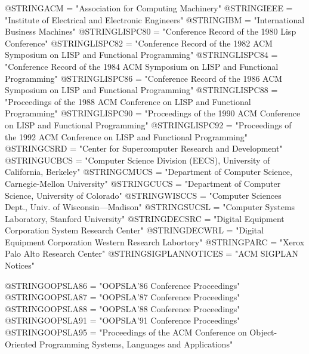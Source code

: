 @STRING{ACM = "Association for Computing Machinery"}
@STRING{IEEE = "Institute of Electrical and Electronic Engineers"}
@STRING{IBM = "International Business Machines"}
@STRING{LISPC80 = "Conference Record of the 1980 Lisp Conference"}
@STRING{LISPC82 = "Conference Record of the 1982 ACM Symposium on LISP and Functional Programming"}
@STRING{LISPC84 = "Conference Record of the 1984 ACM Symposium on LISP and Functional Programming"}
@STRING{LISPC86 = "Conference Record of the 1986 ACM Symposium on LISP and Functional Programming"}
@STRING{LISPC88 = "Proceedings of the 1988 ACM Conference on LISP and Functional Programming"}
@STRING{LISPC90 = "Proceedings of the 1990 ACM Conference on LISP and Functional Programming"}
@STRING{LISPC92 = "Proceedings of the 1992 ACM Conference on LISP and Functional Programming"}
@STRING{CSRD = "Center for Supercomputer Research and Development"}
@STRING{UCBCS = "Computer Science Division (EECS), University of California, Berkeley"}
@STRING{CMUCS = "Department of Computer Science, Carnegie-Mellon University"}
@STRING{CUCS = "Department of Computer Science, University of Colorado"}
@STRING{WISCCS = "Computer Sciences Dept., Univ. of Wisconsin---Madison"}
@STRING{SUCSL = "Computer Systems Laboratory, Stanford University"}
@STRING{DECSRC = "Digital Equipment Corporation System Research Center"}
@STRING{DECWRL = "Digital Equipment Corporation Western Research Labortory"}
@STRING{PARC = "Xerox Palo Alto Research Center"}
@STRING{SIGPLANNOTICES = "ACM SIGPLAN Notices"}

@STRING{OOPSLA86 = "OOPSLA'86 Conference Proceedings"}			  
@STRING{OOPSLA87 = "OOPSLA'87 Conference Proceedings"}			  
@STRING{OOPSLA88 = "OOPSLA'88 Conference Proceedings"}			  
@STRING{OOPSLA91 = "OOPSLA'91 Conference Proceedings"}			  
@STRING{OOPSLA95 = "Proceedings of the ACM Conference on Object-Oriented Programming Systems, Languages and Applications"}			  


